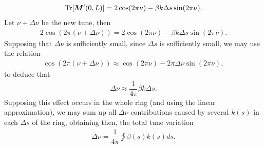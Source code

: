 \begin{align}
	\operatorname{Tr}[\boldsymbol{M}'(0,L)] = 2\cos(2\pi\nu) - \beta k \Delta s \sin(2\pi\nu).
\end{align}
Let $\nu + \Delta\nu$ be the new tune, then
\begin{align}
	2\cos(2\pi(\nu+\Delta\nu)) = 2\cos(2\pi\nu) - \beta k \Delta s \sin(2\pi\nu).
\end{align}
Supposing that $\Delta\nu$ is sufficiently small, since $\Delta s$ is sufficiently small, we may use the relation
\begin{align*}
	\cos(2\pi(\nu+\Delta\nu)) \approx \cos(2\pi\nu) - 2\pi\Delta\nu\sin(2\pi\nu),
\end{align*}
to deduce that
\begin{align}
	\Delta\nu \approx \dfrac{1}{4\pi}\beta k \Delta s.
\end{align}
Supposing this effect occurs in the whole ring (and using the linear approximation), we may sum up all $\Delta\nu$ contributions caused by several $k(s)$ in each $\Delta s$ of the ring, obtaining then, the total tune variation
\begin{align}
	\Delta\nu = \dfrac{1}{4\pi}\oint \beta(s) k(s) ds.
\end{align}
